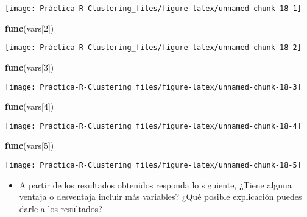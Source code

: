 \documentclass[
]{article}
\newenvironment{Shaded}{\begin{snugshade}}{\end{snugshade}}
\newcommand{\DecValTok}[1]{\textcolor[rgb]{0.00,0.00,0.81}{#1}}
\newcommand{\KeywordTok}[1]{\textcolor[rgb]{0.13,0.29,0.53}{\textbf{#1}}}
\newcommand{\NormalTok}[1]{#1}
\providecommand{\tightlist}{%
  \setlength{\itemsep}{0pt}\setlength{\parskip}{0pt}}
\begin{document}
\begin{center}\texttt{[image: Práctica-R-Clustering\_files/figure-latex/unnamed-chunk-18-1]} \end{center}

\begin{Shaded}
\begin{Highlighting}[]
\KeywordTok{func}\NormalTok{(vars[}\DecValTok{2}\NormalTok{])}
\end{Highlighting}
\end{Shaded}

\begin{center}\texttt{[image: Práctica-R-Clustering\_files/figure-latex/unnamed-chunk-18-2]} \end{center}

\begin{Shaded}
\begin{Highlighting}[]
\KeywordTok{func}\NormalTok{(vars[}\DecValTok{3}\NormalTok{])}
\end{Highlighting}
\end{Shaded}

\begin{center}\texttt{[image: Práctica-R-Clustering\_files/figure-latex/unnamed-chunk-18-3]} \end{center}

\begin{Shaded}
\begin{Highlighting}[]
\KeywordTok{func}\NormalTok{(vars[}\DecValTok{4}\NormalTok{])}
\end{Highlighting}
\end{Shaded}

\begin{center}\texttt{[image: Práctica-R-Clustering\_files/figure-latex/unnamed-chunk-18-4]} \end{center}

\begin{Shaded}
\begin{Highlighting}[]
\KeywordTok{func}\NormalTok{(vars[}\DecValTok{5}\NormalTok{])}
\end{Highlighting}
\end{Shaded}

\begin{center}\texttt{[image: Práctica-R-Clustering\_files/figure-latex/unnamed-chunk-18-5]} \end{center}

\begin{itemize}
\tightlist
\item
  A partir de los resultados obtenidos responda lo siguiente, ¿Tiene
  alguna ventaja o desventaja incluir más variables? ¿Qué posible
  explicación puedes darle a los resultados?
\end{itemize}
\end{document}
